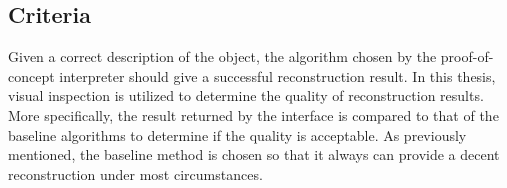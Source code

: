 \subsection{Criteria}
Given a correct description of the object, the algorithm chosen by the proof-of-concept interpreter should give a successful reconstruction result. In this thesis, visual inspection is utilized to determine the quality of reconstruction results. More specifically, the result returned by the interface is compared to that of the baseline algorithms to determine if the quality is acceptable. As previously mentioned, the baseline method is chosen so that it always can provide a decent reconstruction under most circumstances.

